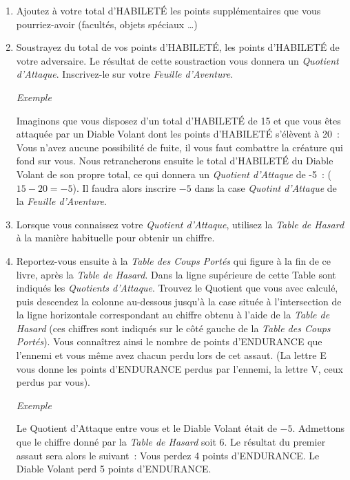 \documentclass[10pt]{book}
\begin{document}
\begin{enumerate}
  \item Ajoutez à votre total d'HABILETÉ les points supplémentaires que vous pourriez-avoir (facultés, objets spéciaux …)
  \item Soustrayez du total de vos points d'HABILETÉ, les points d'HABILETÉ de
  votre adversaire. Le résultat de cette soustraction vous donnera un
  \textit{Quotient d'Attaque}. Inscrivez-le sur votre \textit{Feuille d'Aventure}.
  
  \begin{center}
    \textit{Exemple}
  \end{center}
  Imaginons que vous disposez d'un total d'HABILETÉ de 15 et que vous êtes attaquée
  par un Diable Volant dont les points d'HABILETÉ s'élèvent à 20~: Vous n'avez aucune
  possibilité de fuite, il vous faut combattre la créature qui fond sur vous.
  Nous retrancherons ensuite le total d'HABILETÉ du Diable Volant de son propre total,
  ce qui donnera un \textit{Quotient d'Attaque} de -5~: ($15-20=-5$). Il faudra
  alors inscrire $-5$ dans la case \textit{Quotint d'Attaque} de la \textit{Feuille d'Aventure}.\\
  
  \item Lorsque vous connaissez votre \textit{Quotient d'Attaque}, utilisez la
  \textit{Table de Hasard} à la manière habituelle pour obtenir un chiffre.
  \item Reportez-vous ensuite à la \textit{Table des Coups Portés} qui figure
  à la fin de ce livre, après la \textit{Table de Hasard}. Dans la ligne supérieure
  de cette Table sont indiqués les \textit{Quotients d'Attaque}. Trouvez le Quotient
  que vous avec calculé, puis descendez la colonne au-dessous jusqu'à la case
  située à l'intersection de la ligne horizontale correspondant au chiffre obtenu
  à l'aide de la \textit{Table de Hasard} (ces chiffres sont indiqués sur le côté
  gauche de la \textit{Table des Coups Portés}). Vous connaîtrez ainsi le nombre
  de points d'ENDURANCE que l'ennemi et vous même avez chacun perdu lors de cet
  assaut. (La lettre E vous donne les points d'ENDURANCE perdus par l'ennemi,
  la lettre V, ceux perdus par vous).

  \begin{center}
    \textit{Exemple}
  \end{center}
  Le Quotient d'Attaque entre vous et le Diable Volant était de $-5$. Admettons
  que le chiffre donné par la \textit{Table de Hasard} soit 6. Le résultat du premier
  assaut sera alors le suivant~: Vous perdez 4 points d'ENDURANCE. Le Diable Volant
  perd 5 points d'ENDURANCE.


\end{enumerate}
\end{document}
